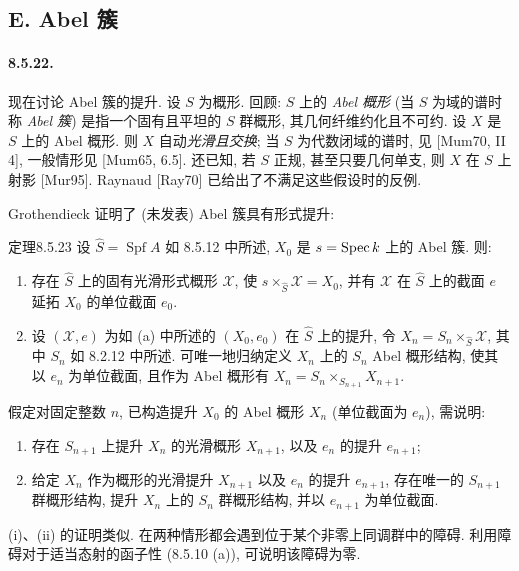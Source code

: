 \subsection*{E. Abel 簇}
\paragraph{8.5.22.}
现在讨论 Abel 簇的提升. 设 $S$ 为概形. 回顾: $S$ 上的 \emph{Abel 概形} (当 $S$ 为域的谱时称 \emph{Abel 簇}) 是指一个固有且平坦的 $S$ 群概形, 其几何纤维约化且不可约. 设 $X$ 是 $S$ 上的 Abel 概形. 则 $X$ 自动\emph{光滑且交换}; 当 $S$ 为代数闭域的谱时, 见 [Mum70, II 4], 一般情形见 [Mum65, 6.5]. 还已知, 若 $S$ 正规, 甚至只要几何单支, 则 $X$ 在 $S$ 上射影 [Mur95]. Raynaud [Ray70] 已给出了不满足这些假设时的反例.

Grothendieck 证明了 (未发表) Abel 簇具有形式提升:
\begin{origstatement}{定理}{8.5.23}\label{ch08:th8523}
设 $\widehat S=\operatorname{Spf}A$ 如 8.5.12 中所述, $X_0$ 是 $s=\operatorname{Spec} k$ 上的 Abel 簇. 则:
\begin{enumerate}
\item[(a)] 存在 $\widehat S$ 上的固有光滑形式概形 $\mathcal X$, 使 $s\times_{\widehat S}\mathcal X=X_0$, 并有 $\mathcal X$ 在 $\widehat S$ 上的截面 $e$ 延拓 $X_0$ 的单位截面 $e_0$.
\item[(b)] 设 $(\mathcal X,e)$ 为如 (a) 中所述的 $(X_0,e_0)$ 在 $\widehat S$ 上的提升, 令 $X_n=S_n\times_{\widehat S}\mathcal X$, 其中 $S_n$ 如 8.2.12 中所述. 可唯一地归纳定义 $X_n$ 上的 $S_n$ Abel 概形结构, 使其以 $e_n$ 为单位截面, 且作为 Abel 概形有 $X_n=S_n\times_{S_{n+1}}X_{n+1}$.
\end{enumerate}
\end{origstatement}
假定对固定整数 $n$, 已构造提升 $X_0$ 的 Abel 概形 $X_n$ (单位截面为 $e_n$), 需说明:
\begin{enumerate}
\item[(i)] 存在 $S_{n+1}$ 上提升 $X_n$ 的光滑概形 $X_{n+1}$, 以及 $e_n$ 的提升 $e_{n+1}$;
\item[(ii)] 给定 $X_n$ 作为概形的光滑提升 $X_{n+1}$ 以及 $e_n$ 的提升 $e_{n+1}$, 存在唯一的 $S_{n+1}$ 群概形结构, 提升 $X_n$ 上的 $S_n$ 群概形结构, 并以 $e_{n+1}$ 为单位截面.
\end{enumerate}
(i)、(ii) 的证明类似. 在两种情形都会遇到位于某个非零上同调群中的障碍. 利用障碍对于适当态射的函子性 (8.5.10 (a)), 可说明该障碍为零.

